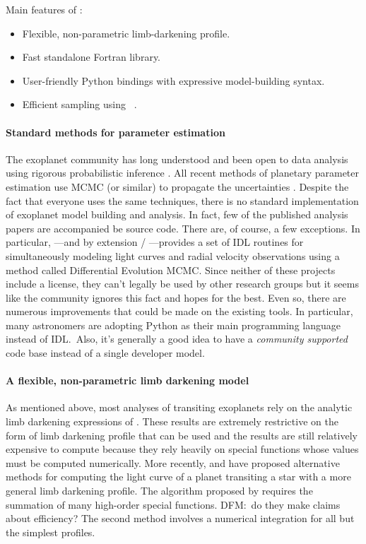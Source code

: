 \documentclass[letterpaper,12pt,preprint]{hack_aastex}
\newcommand{\Bart}{\package{Bart}}
\newcommand{\emcee}{\package{emcee}}
\begin{document}
Main features of \Bart:
\begin{itemize}
\item Flexible, non-parametric limb-darkening profile.
\item Fast standalone Fortran library.
\item User-friendly Python bindings with expressive model-building syntax.
\item Efficient sampling using \emcee\ \citep{emcee}.
\end{itemize}

\paragraph{Standard methods for parameter estimation}
The exoplanet community has long understood and been open to data analysis
using rigorous probabilistic inference \citep[][for example]{ford}.
All recent methods of planetary parameter estimation use MCMC (or similar) to
propagate the uncertainties \citep[][to name only a few]{barclay,dressing,%
kepler5,kepler4}.
Despite the fact that everyone uses the same techniques, there is no standard
implementation of exoplanet model building and analysis.
In fact, few of the published analysis papers are accompanied be source code.
There are, of course, a few exceptions.
In particular,  \citep{exofast}---and by extension
/ \citep{autokep}---provides a set of IDL
routines for simultaneously modeling light curves and radial velocity
observations using a method called Differential Evolution MCMC.%
Since neither of these projects include a license, they can't legally be used
by other research groups but it seems like the community ignores this fact and
hopes for the best.
Even so, there are numerous improvements that could be made on the existing
tools.
In particular, many astronomers are adopting Python as their main programming
language instead of IDL.\
Also, it's generally a good idea to have a \emph{community supported} code
base instead of a single developer model.


\citet{mandel}

\paragraph{A flexible, non-parametric limb darkening model}
As mentioned above, most analyses of transiting exoplanets rely on the
analytic limb darkening expressions of \citet{mandel}.
These results are extremely restrictive on the form of limb darkening profile
that can be used and the results are still relatively expensive to compute
because they rely heavily on special functions whose values must be computed
numerically.
More recently, \citet{crazyass1} and \citet{crazyass2} have proposed
alternative methods for computing the light curve of a planet transiting a
star with a more general limb darkening profile.
The algorithm proposed by \citet{crazyass1} requires the summation of many
high-order special functions.
DFM:\ do they make claims about efficiency?
The second method \citep{crazyass2} involves a numerical integration for
all but the simplest profiles.
\end{document}
